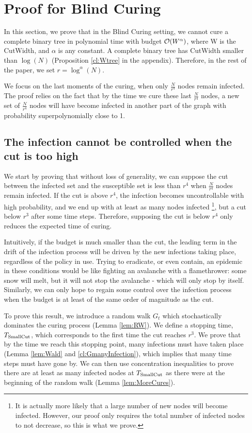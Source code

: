 \section{Proof for Blind Curing} 
In this section, we prove that in the Blind Curing setting, we cannot cure a complete binary tree in polynomial time with budget $\mathcal{O}(W^\alpha)$, where W is the {\sc CutWidth}, and $\alpha$ is any constant. A complete binary tree has {\sc CutWidth} smaller than $\log(N)$ (Proposition \ref{cl:Wtree} in the appendix). Therefore, in the rest of the paper, we set $r = \log^\alpha(N)$.

We focus on the last moments of the curing, when only $\frac{N}{r^4}$ nodes remain infected. The proof relies on the fact that by the time we cure these last $\frac{N}{r^4}$ nodes, a new set of $\frac{N}{r^4}$  nodes will have become infected in another part of the graph with probability superpolynomially close to 1.

\subsection{The infection cannot be controlled when the cut is too high} \label{sec:step1}
We start by proving that without loss of generality, we can suppose the cut between the infected set and the susceptible set is less than $r^4$ when $\frac{N}{r^4}$  nodes remain infected. If the cut is above $r^4$, the infection becomes uncontrollable with high probability, and we end up with at least as many nodes infected \footnote{It is actually more likely that a large number of new nodes will become infected. However, our proof only requires the total number of infected nodes to not decrease, so this is what we prove.}, but a cut below $r^3$ after some time steps. Therefore, supposing the cut is below $r^4$ only reduces the expected time of curing. 

Intuitively, if the budget is much smaller than the cut, the leading term in the drift of the infection process will be driven by the new infections taking place, regardless of the policy in use. Trying to eradicate, or even contain, an epidemic in these conditions would be like fighting an avalanche with a flamethrower: some snow will melt, but it will not stop the avalanche - which will only stop by itself. Similarly, we can only hope to regain some control over the infection process when the budget is at least of the same order of magnitude as the cut. 

To prove this result, we introduce a random walk $G_t$ which stochastically dominates the curing process (Lemma \ref{lem:RW}). We define a stopping time, $T_{\rm SmallCut}$, which corresponds to the first time the cut reaches $r^3$.  We prove that by the time we reach this stopping point, many infections must have taken place (Lemma \ref{lem:Wald} and \ref{cl:GmanyInfection}), which implies that many time steps must have gone by. We can then use concentration inequalities to prove there are at least as many infected nodes at $T_{\rm SmallCut}$ as there were at the beginning of the random walk (Lemma \ref{lem:MoreCures}).


